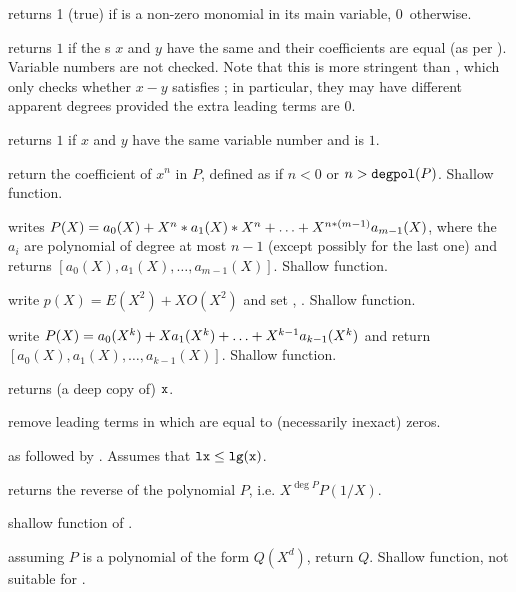  returns 1 (true) if  is a non-zero
monomial in its main variable, 0~otherwise.

 returns $1$ if the s $x$ and $y$
have the same  and their coefficients are equal (as per
). Variable numbers are not checked. Note that this is more
stringent than , which only checks whether $x - y$ satisfies
; in particular, they may have different apparent degrees provided
the extra leading terms are $0$.

 returns $1$ if $x$ and $y$
have the same variable number and  is $1$.


 return the coefficient of $x^n$ in $P$,
defined as  if $n < 0$ or $n > {\tt degpol}(P)$. Shallow
function.

 writes
$P(X)=a_0(X)+X^n*a_1(X)*X^n+\ldots+X^{n*(m-1)}\*a_{m-1}(X)$,
where the $a_i$ are polynomial of degree at most $n-1$
(except possibly for the last one) and returns
$[a_0(X),a_1(X),\ldots,a_{m-1}(X)]$.  Shallow function.

 write $p(X) = E(X^2) +
X O(X^2)$ and set , .  Shallow function.

 write
$P(X)=a_0(X^k)+X\*a_1(X^k)+\ldots+X^{k-1}\*a_{k-1}(X^k)$ and return
$[a_0(X),a_1(X),\ldots,a_{k-1}(X)]$.  Shallow function.

 returns (a deep copy of) ${\tt x}$.

 remove leading terms in  which are
equal to (necessarily inexact) zeros.

 as 
followed by . Assumes that ${\tt lx} \leq
{\tt lg(x)}$.

 returns the reverse of the polynomial
$P$, i.e. $X^{\deg P} P(1/X)$.

 shallow function of .

 assuming $P$ is a polynomial of the
form $Q(X^d)$, return $Q$. Shallow function, not suitable for
.

